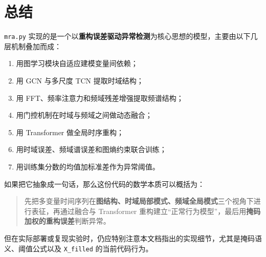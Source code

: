 \documentclass[UTF8]{ctexart}
\begin{document}
\section{总结}

\texttt{mra.py} 实现的是一个以\textbf{重构误差驱动异常检测}为核心思想的模型，主要由以下几层机制叠加而成：
\begin{enumerate}
    \item 用图学习模块自适应建模变量间依赖；
    \item 用 GCN 与多尺度 TCN 提取时域结构；
    \item 用 FFT、频率注意力和频域残差增强提取频谱结构；
    \item 用门控机制在时域与频域之间做动态融合；
    \item 用 Transformer 做全局时序重构；
    \item 用时域误差、频域谱误差和图熵约束联合训练；
    \item 用训练集分数的均值加标准差作为异常阈值。
\end{enumerate}

如果把它抽象成一句话，那么这份代码的数学本质可以概括为：
\begin{quote}
    先把多变量时间序列在\textbf{图结构、时域局部模式、频域全局模式}三个视角下进行表征，再通过融合与 Transformer 重构建立“正常行为模型”，最后用\textbf{掩码加权的重构误差}判断异常。
\end{quote}

但在实际部署或复现实验时，仍应特别注意本文档指出的实现细节，尤其是掩码语义、阈值公式以及 \texttt{X\_filled} 的当前代码行为。
\end{document}
